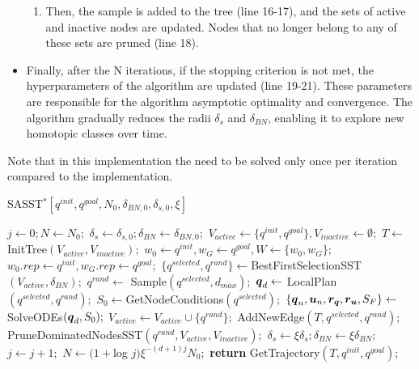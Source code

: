 \begin{itemize}
\begin{enumerate}
        \item Then, the sample is added to the tree (line 16-17), and the sets of active and inactive nodes are updated.
        Nodes that no longer belong to any of these sets are pruned (line 18).
    \end{enumerate}
    \item Finally, after the N iterations, if the stopping criterion is not met, the hyperparameters of the algorithm are updated (line 19-21).
    These parameters are responsible for the algorithm asymptotic optimality and convergence. 
    The algorithm gradually reduces the radii $\delta_s$ and $\delta_{BN}$, enabling it to explore new homotopic classes over time.
\end{itemize}

Note that in this implementation the  need to be solved only once per iteration compared to the  implementation.

\begin{algorithm}[htp]
    \caption{SASST$^* [q^{init}, q^{goal}, N_0, \delta_{BN,0}, \delta_{s,0}, \xi]$}\label{alg:SASST*}
    \begin{algorithmic}[1]
        \State $j \gets 0; N \gets N_0;$
        \State $\delta_{s} \gets \delta_{s,0}; \delta_{BN} \gets \delta_{BN,0};$
        \State $V_{active} \gets \{q^{init}, q^{goal}\}, V_{inactive} \gets \emptyset;$
        \State $T \gets$ InitTree$(V_{active}, V_{inactive});$
        \State $w_0 \gets q^{init}, w_G \gets q^{goal}, W \gets \{w_0, w_G\};$
        \State $w_0.rep \gets q^{init}, w_G.rep \gets q^{goal};$
                \State $\{q^{selected}, q^{rand}\} \gets $BestFirstSelectionSST$(V_{active}, \delta_{BN});$
                \State $q^{rand} \gets$ Sample$(q^{selected}, d_{max});$
                \State $\boldsymbol{q}_d \gets$ LocalPlan$({q^{selected}},{q^{rand}});$
                \State $S_0 \gets $GetNodeConditions$({q^{selected}});$
                \State $\left \{\boldsymbol{q}_n, \boldsymbol{u}_n, \boldsymbol{r_q}, \boldsymbol{r_u}, S_F \right \}  \gets $SolveODEs$(\boldsymbol{q}_d, S_0);$
                        \State $V_{active} \gets V_{active} \cup \{q^{rand}\};$
                        \State AddNewEdge$(T, q^{selected}, q^{rand});$
                        \State PruneDominatedNodesSST$(q^{rand}, V_{active}, V_{inactive});$
                    \EndIf
                \EndIf
            \EndFor
            \State $\delta_s \gets \xi\delta_s; \delta_{BN}\gets\xi\delta_{BN};$
            \State $j \gets j+1;$
            \State $N \gets (1+$log $j)\xi^{-(d+1)j}N_0;$
        \EndWhile
        \State \textbf{return} GetTrajectory$(T, q^{init}, q^{goal})$;
    \end{algorithmic}
\end{algorithm}


